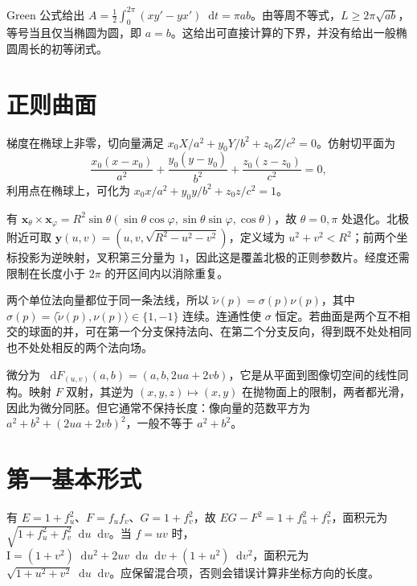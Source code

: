 \documentclass[UTF8,12pt,a4paper,fontset=fandol]{ctexbook}
\newcommand{\dd}{\mathop{}\!\mathrm d}
\newcommand{\ip}[2]{\langle #1,#2\rangle}
\begin{document}
\begin{solve}
Green 公式给出 $A=\frac12\int_0^{2\pi}(xy'-yx')\dd t=\pi ab$。由等周不等式，$L\ge2\pi\sqrt{ab}$，等号当且仅当椭圆为圆，即 $a=b$。这给出可直接计算的下界，并没有给出一般椭圆周长的初等闭式。
\end{solve}

\section{正则曲面}
\begin{solve}
梯度在椭球上非零，切向量满足 $x_0X/a^2+y_0Y/b^2+z_0Z/c^2=0$。仿射切平面为
\[
 \frac{x_0(x-x_0)}{a^2}+\frac{y_0(y-y_0)}{b^2}
 +\frac{z_0(z-z_0)}{c^2}=0,
\]
利用点在椭球上，可化为 $x_0x/a^2+y_0y/b^2+z_0z/c^2=1$。
\end{solve}

\begin{solve}
有 $\mathbf x_\theta\times\mathbf x_\varphi=R^2\sin\theta(\sin\theta\cos\varphi,\sin\theta\sin\varphi,\cos\theta)$，故 $\theta=0,\pi$ 处退化。北极附近可取 $\mathbf y(u,v)=(u,v,\sqrt{R^2-u^2-v^2})$，定义域为 $u^2+v^2<R^2$；前两个坐标投影为逆映射，叉积第三分量为 $1$，因此这是覆盖北极的正则参数片。经度还需限制在长度小于 $2\pi$ 的开区间内以消除重复。
\end{solve}

\begin{solve}
两个单位法向量都位于同一条法线，所以 $\widetilde\nu(p)=\sigma(p)\nu(p)$，其中 $\sigma(p)=\ip{\widetilde\nu(p)}{\nu(p)}\in\{1,-1\}$ 连续。连通性使 $\sigma$ 恒定。若曲面是两个互不相交的球面的并，可在第一个分支保持法向、在第二个分支反向，得到既不处处相同也不处处相反的两个法向场。
\end{solve}

\begin{solve}
微分为 $\dd F_{(u,v)}(a,b)=(a,b,2ua+2vb)$，它是从平面到图像切空间的线性同构。映射 $F$ 双射，其逆为 $(x,y,z)\mapsto(x,y)$ 在抛物面上的限制，两者都光滑，因此为微分同胚。但它通常不保持长度：像向量的范数平方为 $a^2+b^2+(2ua+2vb)^2$，一般不等于 $a^2+b^2$。
\end{solve}

\section{第一基本形式}
\begin{solve}
有 $E=1+f_u^2$、$F=f_uf_v$、$G=1+f_v^2$，故 $EG-F^2=1+f_u^2+f_v^2$，面积元为 $\sqrt{1+f_u^2+f_v^2}\dd u\dd v$。当 $f=uv$ 时，$\mathrm I=(1+v^2)\dd u^2+2uv\dd u\dd v+(1+u^2)\dd v^2$，面积元为 $\sqrt{1+u^2+v^2}\dd u\dd v$。应保留混合项，否则会错误计算非坐标方向的长度。
\end{solve}
\end{document}
